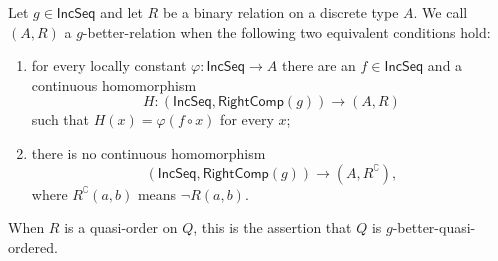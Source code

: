 \begin{definition}
Let $g\in\mathsf{IncSeq}$ and let $R$ be a binary relation on a discrete
type $A$.  We call $(A,R)$ a $g$-better-relation when the following two
equivalent conditions hold:
\begin{enumerate}
\item for every locally constant $\varphi:\mathsf{IncSeq}\to A$ there are
an $f\in\mathsf{IncSeq}$ and a continuous homomorphism
\[
H:(\mathsf{IncSeq},\mathsf{RightComp}(g))\to(A,R)
\]
such that $H(x)=\varphi(f\circ x)$ for every $x$;
\item there is no continuous homomorphism
\[
(\mathsf{IncSeq},\mathsf{RightComp}(g))
\longrightarrow(A,R^{\complement}),
\]
where $R^{\complement}(a,b)$ means $\neg R(a,b)$.
\end{enumerate}
When $R$ is a quasi-order on $Q$, this is the assertion that $Q$ is
$g$-better-quasi-ordered.
\end{definition}
